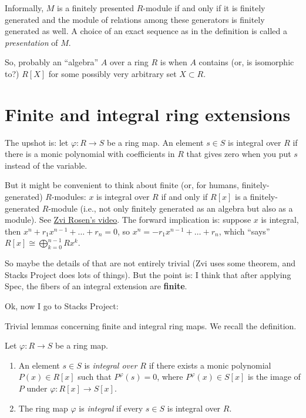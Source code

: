 Informally, $M$ is a finitely presented $R$-module if and only if
it is finitely generated and the module of relations among these
generators is finitely generated as well.
A choice of an exact sequence as in the definition is called a
{\it presentation} of $M$.

So, probably an ``algebra'' $A$ over a ring  $R$ is when $A$ contains 
(or, is isomorphic to?)  $R[X]$ for some possibly very arbitrary set
 $X\subset R$.


\section{Finite and integral ring extensions}
\label{section-finite-ring-extensions}

\noindent
The upshot is: let $\varphi:R \to S$ be a ring map.
An element $s \in S$ is integral over $R$ if there
is a monic polynomial with coefficients in $R$
that gives zero when you put $s$ instead of the variable.

But it might be convenient to think about
finite (or, for humans, finitely-generated) $R$-modules:
$x$ is integral over $R$ if and only if $R[x]$
is a finitely-generated  $R$-module (i.e.,
not only finitely generated as an algebra
but also as a module).
See \href{
https://youtu.be/5fCHj80BQHw?si=o7tMC4tRsbBnwmJi}{Zvi Rosen's video}.
The forward implication is: suppose $x$ is integral,
then $x^n+r_1x^{n-1}+\ldots+r_n=0$, so
$x^n=-r_1x^{n-1}+\ldots+r_n$,
which ``says'' $R[x] \cong \bigoplus_{k=0}^{n-1}Rx^k$.

So maybe the details of that are not entirely trivial (Zvi uses some theorem,
and Stacks Project does lots of things).
But the point is: I think that after applying Spec,
the fibers of an integral extension are {\bf finite}.

Ok, now I go to Stacks Project:

\medskip\noindent
Trivial lemmas concerning finite and integral ring maps.
We recall the definition.

\begin{definition}
\label{definition-integral-ring-map}
Let $\varphi : R \to S$ be a ring map.
\begin{enumerate}
\item An element $s \in S$
is {\it integral over $R$} if there exists a monic
polynomial $P(x) \in R[x]$ such that
$P^\varphi(s) = 0$, where $P^\varphi(x) \in S[x]$
is the image of $P$ under $\varphi : R[x] \to S[x]$.
\item  The ring map $\varphi$ is {\it integral}
if every $s \in S$ is integral over $R$.
\end{enumerate}
\end{definition}

